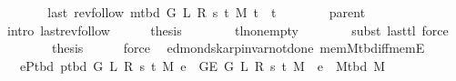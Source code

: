 \begin{isabellebody}
\ {\isacharminus}{\kern0pt}\isanewline
\ \ \ \ \isamarkupfalse%
\ {\isachardoublequoteopen}last\ {\isacharparenleft}{\kern0pt}rev{\isacharunderscore}{\kern0pt}follow\ {\isacharparenleft}{\kern0pt}m{\isacharunderscore}{\kern0pt}tbd\ G\ L\ R\ s\ t\ M{\isacharparenright}{\kern0pt}\ t{\isacharparenright}{\kern0pt}\ {\isacharequal}{\kern0pt}\ t{\isachardoublequoteclose}\isanewline
\ \ \ \ \ \ \isamarkupfalse%
\ parent\isanewline
\ \ \ \ \ \ \isamarkupfalse%
\ {\isacharparenleft}{\kern0pt}intro\ last{\isacharunderscore}{\kern0pt}rev{\isacharunderscore}{\kern0pt}follow{\isacharparenright}{\kern0pt}\isanewline
\ \ \ \ \isamarkupfalse%
\ {\isacharquery}{\kern0pt}thesis\isanewline
\ \ \ \ \ \ \isamarkupfalse%
\ tl{\isacharunderscore}{\kern0pt}non{\isacharunderscore}{\kern0pt}empty\isanewline
\ \ \ \ \ \ \isamarkupfalse%
\ {\isacharparenleft}{\kern0pt}subst\ last{\isacharunderscore}{\kern0pt}tl{\isacharparenright}{\kern0pt}\ force{\isacharplus}{\kern0pt}\isanewline
\ \ \isamarkupfalse%
\isanewline
\ \ \isamarkupfalse%
\ \isamarkupfalse%
\ {\isacharquery}{\kern0pt}thesis\isanewline
\ \ \ \ \isamarkupfalse%
\ force\isanewline
{}\isamarkupfalse%
%
\endisatagproof
{\isafoldproof}%
%
\isadelimproof
\isanewline
%
\endisadelimproof
%
\isadeliminvisible
\isanewline
%
\endisadeliminvisible
%
\isataginvisible
{}\isamarkupfalse%
\ {\isacharparenleft}{\kern0pt}\ edmonds{\isacharunderscore}{\kern0pt}karp{\isacharunderscore}{\kern0pt}invar{\isacharunderscore}{\kern0pt}not{\isacharunderscore}{\kern0pt}done{\isacharunderscore}{\kern0pt}{}{\isacharparenright}{\kern0pt}\ mem{\isacharunderscore}{\kern0pt}M{\isacharunderscore}{\kern0pt}tbd{\isacharunderscore}{\kern0pt}iff{\isacharunderscore}{\kern0pt}mem{\isacharunderscore}{\kern0pt}E{}{\isacharcolon}{\kern0pt}\isanewline
\ \ \ {\isachardoublequoteopen}{\isasymforall}e{\isasymin}P{\isacharunderscore}{\kern0pt}tbd\ {\isacharparenleft}{\kern0pt}p{\isacharunderscore}{\kern0pt}tbd\ G\ L\ R\ s\ t\ M{\isacharparenright}{\kern0pt}{\isachardot}{\kern0pt}\ e\ {\isasymin}\ G{\isachardot}{\kern0pt}E\ {\isacharparenleft}{\kern0pt}G{}\ L\ R\ s\ t\ M{\isacharparenright}{\kern0pt}\ {\isasymlongleftrightarrow}\ e\ {\isasymin}\ M{\isacharunderscore}{\kern0pt}tbd\ M{\isachardoublequoteclose}%
\endisataginvisible
{\isafoldinvisible}%
%
\isadeliminvisible
\isanewline
%
\endisadeliminvisible

\end{isabellebody}
